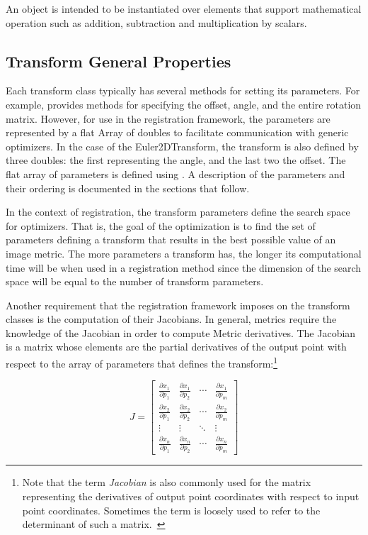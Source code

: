 An  object is intended to be instantiated over elements that
support mathematical operation such as addition, subtraction and multiplication
by scalars.


\subsection{Transform General Properties}
\label{sec:TransformGeneralProperties}

 Each transform class typically has
several methods for setting its parameters.  For example,
 provides methods for specifying the offset,
angle, and the entire rotation matrix.  However, for use in the
registration framework, the parameters are represented by a flat
Array of doubles to facilitate communication with generic
optimizers. In the case of the Euler2DTransform, the transform is also
defined by three doubles: the first representing the angle, and the last two the
offset. The flat array of parameters is defined using . A
description of the parameters and their ordering is documented in the
sections that follow.

In the context of registration, the transform parameters define the search
space for optimizers. That is, the goal of the optimization is to find the set
of parameters defining a transform that results in the best possible value of
an image metric. The more parameters a transform has, the longer its
computational time will be when used in a registration method since the
dimension of the search space will be equal to the number of transform
parameters.


Another requirement that the registration framework imposes on the transform
classes is the computation of their Jacobians. In general, metrics require
the knowledge of the Jacobian in order to compute Metric derivatives.
The Jacobian is a matrix whose elements are the partial derivatives of the
output point with respect to the array of parameters that defines the
transform:\footnote{Note that the term \emph{Jacobian} is also commonly used
for the matrix representing the derivatives of output point coordinates with
respect to input point coordinates. Sometimes the term is loosely used to
refer to the determinant of such a matrix.~\cite{Dodson1997}}

\begin{equation}
J=\left[ \begin{array}{cccc}
\frac{\partial x_{1}}{\partial p_{1}} &
\frac{\partial x_{1}}{\partial p_{2}} &
\cdots  & \frac{\partial x_{1}}{\partial p_{m}}\\
\frac{\partial x_{2}}{\partial p_{1}} &
\frac{\partial x_{2}}{\partial p_{2}} &
\cdots  & \frac{\partial x_{2}}{\partial p_{m}}\\
\vdots  & \vdots  & \ddots  & \vdots \\
\frac{\partial x_{n}}{\partial p_{1}} &
\frac{\partial x_{n}}{\partial p_{2}} &
\cdots  & \frac{\partial x_{n}}{\partial p_{m}}
\end{array}\right]
\end{equation}


